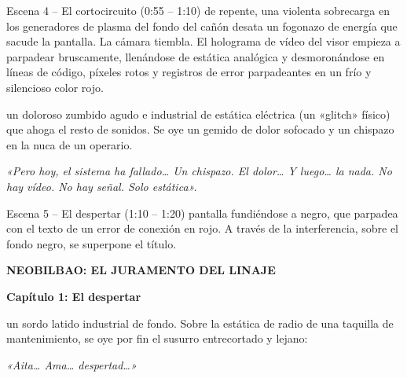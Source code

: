 \begin{CajaCinematica}{Escena 4 -- El cortocircuito (0:55 -- 1:10)}
 de repente, una violenta sobrecarga en los generadores de plasma del fondo del cañón desata un fogonazo de energía que sacude la pantalla. La cámara tiembla. El holograma de vídeo del visor empieza a parpadear bruscamente, llenándose de estática analógica y desmoronándose en líneas de código, píxeles rotos y registros de error parpadeantes en un frío y silencioso color rojo.\par
{} un doloroso zumbido agudo e industrial de estática eléctrica (un «glitch» físico) que ahoga el resto de sonidos. Se oye un gemido de dolor sofocado y un chispazo en la nuca de un operario.\par
{}\par
\textit{«Pero hoy, el sistema ha fallado\ldots{} Un chispazo. El dolor\ldots{} Y luego\ldots{} la nada. No hay vídeo. No hay señal. Solo estática».}
\end{CajaCinematica}

\begin{CajaCinematica}{Escena 5 -- El despertar (1:10 -- 1:20)}
 pantalla fundiéndose a negro, que parpadea con el texto de un error de conexión en rojo. A través de la interferencia, sobre el fondo negro, se superpone el título.\par
{}\par
\textbf{NEOBILBAO: EL JURAMENTO DEL LINAJE}\par
\textbf{Capítulo 1: El despertar}\par
{} un sordo latido industrial de fondo. Sobre la estática de radio de una taquilla de mantenimiento, se oye por fin el susurro entrecortado y lejano:\par
\textit{«Aita\ldots{} Ama\ldots{} despertad\ldots{}»}
\end{CajaCinematica}
